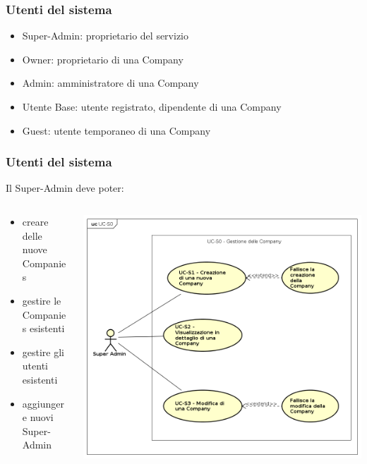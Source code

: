 \begin{frame}
  \frametitle{Utenti del sistema}

  \begin{itemize}
  \item Super-Admin: proprietario del servizio
  \item Owner: proprietario di una Company
  \item Admin: amministratore di una Company
  \item Utente Base: utente registrato, dipendente di una Company
  \item Guest: utente temporaneo di una Company
  \end{itemize}

\end{frame}

\begin{frame}
  \frametitle{Utenti del sistema}
  Il Super-Admin deve poter:
  \begin{columns}
    \begin{column}{0.5\textwidth}   
    \begin{itemize}
    \item creare delle nuove Companies
    \item gestire le Companies esistenti
    \item gestire gli utenti esistenti
    \item aggiungere nuovi Super-Admin
    \end{itemize}
    \end{column}
    \begin{column}{0.5\textwidth}
    \includegraphics[width=0.8\columnwidth]{res/img/SuperAdmin.png}
    \end{column}
  \end{columns}
\end{frame}

